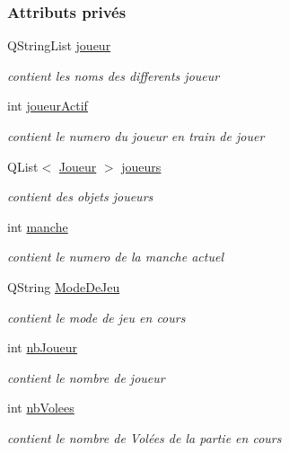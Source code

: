 \subsubsection*{Attributs privés}
\begin{DoxyCompactItemize}
\item 
Q\+String\+List \hyperlink{class_darts_a97cc62d823c3d41604bb4a2d329ddfea}{joueur}
\begin{DoxyCompactList}\small\item\em contient les noms des differents joueur \end{DoxyCompactList}\item 
int \hyperlink{class_darts_a68fb01b9aad6502e4429dfbf2a72d50b}{joueur\+Actif}
\begin{DoxyCompactList}\small\item\em contient le numero du joueur en train de jouer \end{DoxyCompactList}\item 
Q\+List$<$ \hyperlink{class_joueur}{Joueur} $>$ \hyperlink{class_darts_a81bc116f3ae70cea1f492f87f01901c7}{joueurs}
\begin{DoxyCompactList}\small\item\em contient des objets joueurs \end{DoxyCompactList}\item 
int \hyperlink{class_darts_ac7b7bd23e64b4fab3895f02f085ea85f}{manche}
\begin{DoxyCompactList}\small\item\em contient le numero de la manche actuel \end{DoxyCompactList}\item 
Q\+String \hyperlink{class_darts_a281fd6201343dfb65ab81c93fd60f786}{Mode\+De\+Jeu}
\begin{DoxyCompactList}\small\item\em contient le mode de jeu en cours \end{DoxyCompactList}\item 
int \hyperlink{class_darts_ac5ae0e3546d00f59adba76c4ece71725}{nb\+Joueur}
\begin{DoxyCompactList}\small\item\em contient le nombre de joueur \end{DoxyCompactList}\item 
int \hyperlink{class_darts_ae73a0b876ca354c7abd0d39db15c94fa}{nb\+Volees}
\begin{DoxyCompactList}\small\item\em contient le nombre de Volées de la partie en cours \end{DoxyCompactList}\item 

\end{DoxyCompactItemize}
